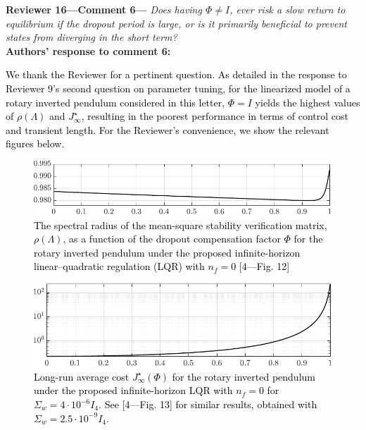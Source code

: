 \begin{bibunit}[alpha]
\textbf{Reviewer 16---Comment 6---}\textit{%
Does having $\Phi\neq I$, ever risk a slow return to equilibrium if the dropout period is large, or is it primarily beneficial to prevent states from diverging in the short term?}\\[2mm]
\textbf{Authors' response to comment 6:} \textcolor{black}{We thank the Reviewer for a pertinent question. As detailed in the response to Reviewer 9's second question on parameter tuning, for the linearized model of a rotary inverted pendulum considered in this letter, $\mathit{\Phi}=I$ yields the highest values of $\rho(\mathit{\Lambda})$ and $J_{\infty}^{\star}$, resulting in the poorest performance in terms of control cost and transient length. For the Reviewer's convenience, we show the relevant figures below.
\setcounter{figure}{0}
\begin{figure}[h!]
\begin{center}
\includegraphics[width=0.7\columnwidth]{stability-cntrl-2.pdf}
\caption{The spectral radius of the mean-square stability verification matrix, $\rho(\mathit{\Lambda})$, as a function of the dropout compensation factor $\mathit{\Phi}$ for the rotary inverted pendulum under the proposed infinite-horizon linear–quadratic regulation (LQR) with $n_f=0$ [4—Fig. 12]}
\end{center}
\end{figure}
\vspace*{-10pt}
\begin{figure}[h!]
\begin{center}
\includegraphics[width=0.7\columnwidth]{cost-cntrl-2.pdf}
\caption{Long-run average cost $J_{\infty}^{\star}(\mathit{\Phi})$ for the rotary inverted pendulum under the proposed infinite-horizon LQR with $n_f=0$ for $\Sigma_{w}=4\cdot 10^{-6} I_4$. See [4—Fig. 13] for similar results, obtained with $\Sigma_{w}=2.5\cdot 10^{-9} I_4$.}
\end{center}
\end{figure}
\vspace*{-10pt}
\setcounter{figure}{3}
}
\end{bibunit}
